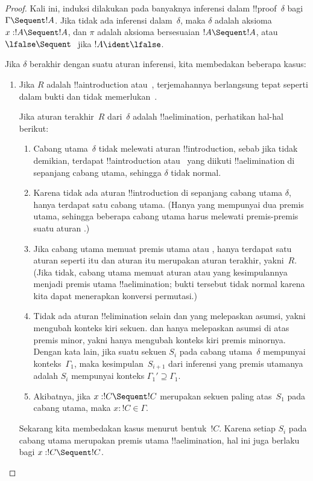 \documentclass[../../../include/open-logic-section]{subfiles}
\begin{document}
\begin{proof}
Kali ini, induksi dilakukan pada banyaknya inferensi dalam
!!{proof}~$\delta$ bagi $\Gamma \Sequent !A$. Jika tidak ada inferensi
dalam~$\delta$, maka $\delta$ adalah aksioma $x:!A \Sequent !A$, dan $\pi$
adalah aksioma bersesuaian $!A \Sequent !A$, atau
$\lfalse \Sequent \ $ jika $!A \ident \lfalse$.

Jika $\delta$ berakhir dengan suatu aturan inferensi, kita membedakan
beberapa kasus:
\begin{enumerate}
  \item Jika $R$ adalah !!a{introduction} atau~\FalseInt, terjemahannya
  berlangsung tepat seperti dalam bukti
   dan tidak memerlukan~\Cut.

  Jika aturan terakhir~$R$ dari~$\delta$ adalah !!a{elimination}, perhatikan
  hal-hal berikut:
  \begin{enumerate}
    \item Cabang utama~$\delta$ tidak melewati aturan !!{introduction},
    sebab jika tidak demikian, terdapat !!a{introduction} atau~\FalseInt{}
    yang diikuti !!a{elimination} di sepanjang cabang utama, sehingga
    $\delta$ tidak normal.
    \item Karena tidak ada aturan !!{introduction} di sepanjang cabang utama
    $\delta$, hanya terdapat satu cabang utama. (Hanya \Intro{\land} yang
    mempunyai dua premis utama, sehingga beberapa cabang utama harus
    melewati premis-premis suatu aturan \Intro{\land}.)
    \item Jika cabang utama memuat premis utama \Elim{\lor} atau
    \Elim{\lexists}, hanya terdapat satu aturan seperti itu dan aturan itu
    merupakan aturan terakhir, yakni~$R$. (Jika tidak, cabang utama memuat
    aturan \Elim{\lor} atau \Elim{\lexists} yang kesimpulannya menjadi
    premis utama !!a{elimination}; bukti tersebut tidak normal karena kita
    dapat menerapkan konversi permutasi.)
  \item Tidak ada aturan !!{elimination} selain \Elim{\lor} dan
  \Elim{\lexists} yang melepaskan asumsi, yakni mengubah konteks kiri sekuen.
  \Elim{\lor} dan \Elim{\lexists} hanya melepaskan asumsi di atas premis
  minor, yakni hanya mengubah konteks kiri premis minornya. Dengan kata lain,
  jika suatu sekuen $S_i$ pada cabang utama~$\delta$ mempunyai
  konteks~$\Gamma_1$, maka kesimpulan~$S_{i+1}$ dari inferensi yang premis
  utamanya adalah $S_i$ mempunyai konteks
  $\Gamma_1' \supseteq \Gamma_1$.
  \item Akibatnya, jika $x: !C \Sequent !C$ merupakan sekuen paling
  atas~$S_1$ pada cabang utama, maka $x:!C \in \Gamma$.
  \end{enumerate}
  Sekarang kita membedakan kasus menurut bentuk~$!C$. Karena setiap $S_i$
  pada cabang utama merupakan premis utama !!a{elimination}, hal ini juga
  berlaku bagi $x:!C \Sequent !C$.


\end{enumerate}
\end{proof}
\end{document}
